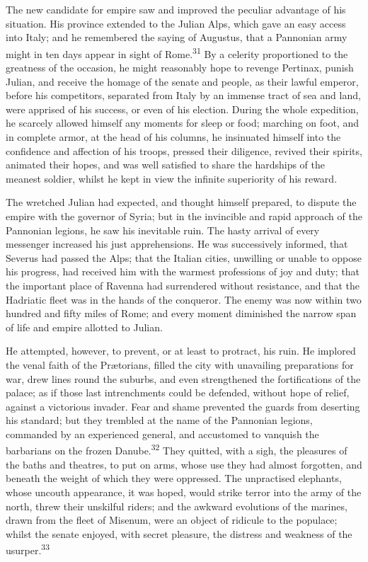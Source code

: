 The new candidate for empire saw and improved the peculiar
advantage of his situation. His province extended to the Julian
Alps, which gave an easy access into Italy; and he remembered the
saying of Augustus, that a Pannonian army might in ten days
appear in sight of Rome.\textsuperscript{31} By a celerity proportioned to the
greatness of the occasion, he might reasonably hope to revenge
Pertinax, punish Julian, and receive the homage of the senate and
people, as their lawful emperor, before his competitors,
separated from Italy by an immense tract of sea and land, were
apprised of his success, or even of his election. During the
whole expedition, he scarcely allowed himself any moments for
sleep or food; marching on foot, and in complete armor, at the
head of his columns, he insinuated himself into the confidence
and affection of his troops, pressed their diligence, revived
their spirits, animated their hopes, and was well satisfied to
share the hardships of the meanest soldier, whilst he kept in
view the infinite superiority of his reward.


The wretched Julian had expected, and thought himself prepared,
to dispute the empire with the governor of Syria; but in the
invincible and rapid approach of the Pannonian legions, he saw
his inevitable ruin. The hasty arrival of every messenger
increased his just apprehensions. He was successively informed,
that Severus had passed the Alps; that the Italian cities,
unwilling or unable to oppose his progress, had received him with
the warmest professions of joy and duty; that the important place
of Ravenna had surrendered without resistance, and that the
Hadriatic fleet was in the hands of the conqueror. The enemy was
now within two hundred and fifty miles of Rome; and every moment
diminished the narrow span of life and empire allotted to Julian.

He attempted, however, to prevent, or at least to protract, his
ruin. He implored the venal faith of the Prætorians, filled the
city with unavailing preparations for war, drew lines round the
suburbs, and even strengthened the fortifications of the palace;
as if those last intrenchments could be defended, without hope of
relief, against a victorious invader. Fear and shame prevented
the guards from deserting his standard; but they trembled at the
name of the Pannonian legions, commanded by an experienced
general, and accustomed to vanquish the barbarians on the frozen
Danube.\textsuperscript{32} They quitted, with a sigh, the pleasures of the baths
and theatres, to put on arms, whose use they had almost
forgotten, and beneath the weight of which they were oppressed.
The unpractised elephants, whose uncouth appearance, it was
hoped, would strike terror into the army of the north, threw
their unskilful riders; and the awkward evolutions of the
marines, drawn from the fleet of Misenum, were an object of
ridicule to the populace; whilst the senate enjoyed, with secret
pleasure, the distress and weakness of the usurper.\textsuperscript{33}

